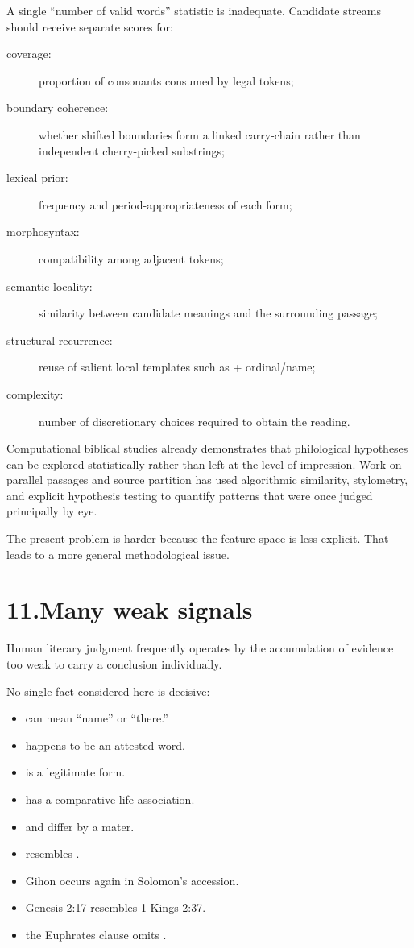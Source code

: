 A single ``number of valid words'' statistic is inadequate.  Candidate streams should receive separate scores for:

\begin{description}
\item[coverage:] proportion of consonants consumed by legal tokens;
\item[boundary coherence:] whether shifted boundaries form a linked carry-chain rather than independent cherry-picked substrings;
\item[lexical prior:] frequency and period-appropriateness of each form;
\item[morphosyntax:] compatibility among adjacent tokens;
\item[semantic locality:] similarity between candidate meanings and the surrounding passage;
\item[structural recurrence:] reuse of salient local templates such as  + ordinal/name;
\item[complexity:] number of discretionary choices required to obtain the reading.
\end{description}

Computational biblical studies already demonstrates that philological hypotheses can be explored statistically rather than left at the level of impression.  Work on parallel passages and source partition has used algorithmic similarity, stylometry, and explicit hypothesis testing to quantify patterns that were once judged principally by eye.\cite{NaaijerRoorda2016,YoffeEtAl2023}

The present problem is harder because the feature space is less explicit.  That leads to a more general methodological issue.

\section*{11.\quad Many weak signals}

Human literary judgment frequently operates by the accumulation of evidence too weak to carry a conclusion individually.

No single fact considered here is decisive:

\begin{itemize}
\item {} can mean ``name'' or ``there.''
\item {} happens to be an attested word.
\item {} is a legitimate form.
\item {} has a comparative life association.
\item {} and  differ by a mater.
\item {} resembles .
\item Gihon occurs again in Solomon's accession.
\item Genesis 2:17 resembles 1 Kings 2:37.
\item the Euphrates clause omits .
\end{itemize}

